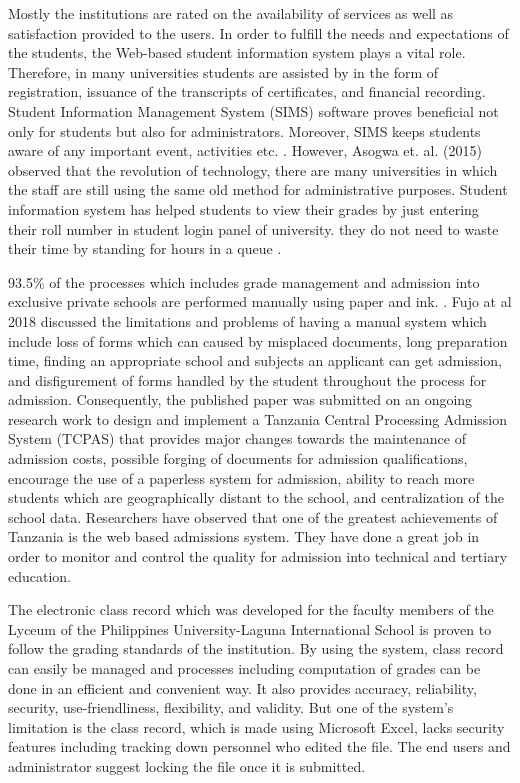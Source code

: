 \documentclass[11pt,a4paper,titlepage]{article}
\begin{document}
Mostly the institutions are rated on the availability of services as well as satisfaction provided to the users. In order to fulfill the needs and expectations of the students, the Web-based student information system plays a vital role. Therefore, in many universities students are assisted by in the form of registration,  issuance of the transcripts of certificates, and financial recording. Student Information Management System (SIMS) software proves beneficial not only for students but also for administrators. Moreover, SIMS keeps students aware of any important event, activities etc. \cite{Asogwa}. However, Asogwa et. al. (2015) observed that the revolution of technology, there are many universities in which the staff are still using the same old method for administrative purposes. Student information system has helped students to view their grades by just entering their roll number in student login panel of university. they do not need to waste their time by standing for hours in a queue \cite{SIAS}.

93.5\% of the processes which includes grade management and admission into exclusive private schools are performed manually using paper and ink. \cite{Fujo}. Fujo at al 2018 discussed the limitations and problems of having a manual system which include loss of forms which can caused by misplaced documents, long preparation time, finding an appropriate school and subjects an applicant can get admission, and disfigurement of forms handled by the student throughout the process for admission. Consequently, the published paper was submitted on an ongoing research work to design and implement a Tanzania Central Processing Admission System (TCPAS) that provides major changes towards the maintenance of admission costs, possible forging of documents for admission qualifications, encourage the use of a paperless system for admission, ability to reach more students which are geographically distant to the school, and centralization of the school data. Researchers have observed that one of the greatest achievements of Tanzania is the web based admissions system. They have done a great job in order to monitor and control the quality for admission into technical and tertiary education.

The electronic class record which was developed for the faculty members of the Lyceum of the Philippines University-Laguna International School is proven to follow the grading standards of the institution. By using the system, class record can easily be managed and processes including computation of grades can be done in an efficient and convenient way. It also provides accuracy, reliability, security, use-friendliness, flexibility, and validity. But one of the system's limitation is the class record, which is made using Microsoft Excel, lacks security features including tracking down personnel who edited the file. The end users and administrator suggest locking the file once it is submitted. \cite{Dellosa}
\end{document}
